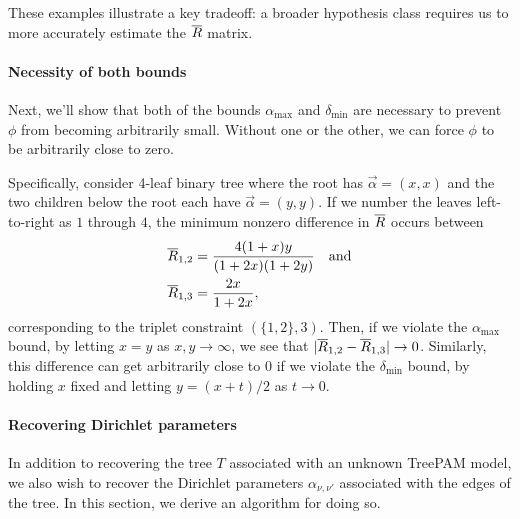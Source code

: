 \documentclass{article}
\theoremstyle{definition}
\newcommand{\deltaMin}{\delta_{\text{min}}}
\newcommand{\alphaMax}{\alpha_{\text{max}}}
\begin{document}
These examples illustrate a key tradeoff: a broader hypothesis class requires us to more accurately estimate the $\overline{R}$ matrix.


\paragraph{Necessity of both bounds}
Next, we'll show that both of the bounds $\alphaMax$ and $\deltaMin$ are necessary to prevent $\phi$ from becoming arbitrarily small.
Without one or the other, we can force $\phi$ to be arbitrarily close to zero.

Specifically, consider 4-leaf binary tree where the root has $\vec\alpha = (x,x)$ and the two children below the root each have $\vec\alpha = (y,y)$.
If we number the leaves left-to-right as $1$ through $4$, the minimum nonzero difference in $\overline{R}$ occurs between
\begin{align*}
\overline{R}_{1,2} &= \frac{4(1+x)y}{(1+2x)(1+2y)} \quad \text{and} \\
\overline{R}_{1,3} &= \frac{2x}{1+2x},
\end{align*}
corresponding to the triplet constraint $(\{1,2\},3)$.
Then, if we violate the $\alphaMax$ bound, by letting $x = y$ as $x,y \to \infty$, we see that $|\overline{R}_{1,2} - \overline{R}_{1,3}| \to 0$.
Similarly, this difference can get arbitrarily close to $0$ if we violate the $\deltaMin$ bound, by holding $x$ fixed and letting $y = (x+t) / 2$ as $t \to 0$.


\paragraph{Recovering Dirichlet parameters}
In addition to recovering the tree $T$ associated with an unknown TreePAM model, we also wish to recover the Dirichlet parameters $\alpha_{\nu,\nu'}$ associated with the edges of the tree.
In this section, we derive an algorithm for doing so.
\end{document}
